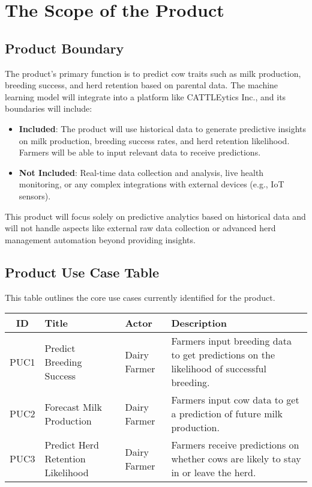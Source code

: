 \documentclass[12pt]{article}
\begin{document}
\section{The Scope of the Product}


\subsection{Product Boundary}
The product's primary function is to predict cow traits such as milk production, 
breeding success, and herd retention based on parental data. The machine learning 
model will integrate into a platform like CATTLEytics Inc., and its 
boundaries will include:

\begin{itemize}
    \item \textbf{Included}: The product will use historical data to generate 
    predictive insights on milk production, breeding success rates, and herd 
    retention likelihood. Farmers will be able to input relevant data to 
    receive predictions.
    \item \textbf{Not Included}: Real-time data collection and analysis, 
    live health monitoring, or any complex integrations with external devices 
    (e.g., IoT sensors).
\end{itemize}

This product will focus solely on predictive analytics based on historical data 
and will not handle aspects like external raw data collection or advanced herd management 
automation beyond providing insights.

\subsection{Product Use Case Table}
This table outlines the core use cases currently identified for the product.

\begin{table}[h!]
\centering
\begin{tabularx}{\textwidth}{|c|l|l|X|}
    \hline
    \textbf{ID} & \textbf{Title} & \textbf{Actor} & \textbf{Description} \\
    \hline
    PUC1 & Predict Breeding Success & Dairy Farmer & Farmers input breeding 
    data to get predictions on the likelihood of successful breeding. \\
    \hline
    PUC2 & Forecast Milk Production & Dairy Farmer & Farmers input cow data 
    to get a prediction of future milk production. \\
    \hline
    PUC3 & Predict Herd Retention Likelihood & Dairy Farmer & Farmers receive 
    predictions on whether cows are likely to stay in or leave the herd. \\
    \hline
\end{tabularx}
\end{table}
\end{document}
